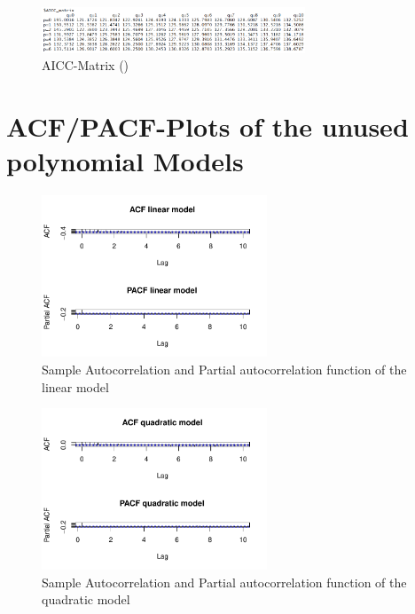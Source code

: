 \documentclass[11pt,a4paper]{article}
\begin{document}
\begin{figure}[H]
    \centering
    \includegraphics[width=0.7\textwidth]{aicc_matrix}
    \caption{AICC-Matrix (\citep{aic86})}
    \label{fig:aicc_matrix}
\end{figure}



\section{ACF/PACF-Plots of the unused polynomial Models}
\label{sec:ACFPACFunused}

\begin{figure}[H]
    \centering
    \includegraphics[width=0.6\textwidth]{acf_pacf_linearmodel}
    \caption{Sample Autocorrelation and Partial autocorrelation function of the linear model}
    \label{fig:acf_pacf_linearmodel}
\end{figure}

\begin{figure}[H]
    \centering
    \includegraphics[width=0.6\textwidth]{acf_pacf_quadraticmodel}
    \caption{Sample Autocorrelation and Partial autocorrelation function of the quadratic model}
    \label{fig:acf_pacf_quadraticmodel}
\end{figure}
\end{document}
